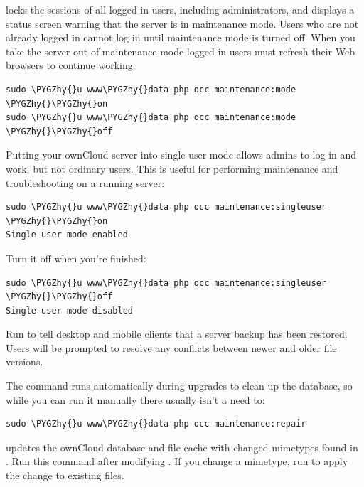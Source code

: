 \documentclass[letterpaper,10pt,english]{sphinxmanual}
\def\PYGZhy{\char`\-}
\begin{document}
 locks the sessions of all logged-in users, including
administrators, and displays a status screen warning that the server is in
maintenance mode. Users who are not already logged in cannot log in until
maintenance mode is turned off. When you take the server out of maintenance mode
logged-in users must refresh their Web browsers to continue working:

\begin{Verbatim}[commandchars=\\\{\}]
sudo \PYGZhy{}u www\PYGZhy{}data php occ maintenance:mode \PYGZhy{}\PYGZhy{}on
sudo \PYGZhy{}u www\PYGZhy{}data php occ maintenance:mode \PYGZhy{}\PYGZhy{}off
\end{Verbatim}

Putting your ownCloud server into single-user mode allows admins to log in and
work, but not ordinary users. This is useful for performing maintenance and
troubleshooting on a running server:

\begin{Verbatim}[commandchars=\\\{\}]
sudo \PYGZhy{}u www\PYGZhy{}data php occ maintenance:singleuser \PYGZhy{}\PYGZhy{}on
Single user mode enabled
\end{Verbatim}

Turn it off when you're finished:

\begin{Verbatim}[commandchars=\\\{\}]
sudo \PYGZhy{}u www\PYGZhy{}data php occ maintenance:singleuser \PYGZhy{}\PYGZhy{}off
Single user mode disabled
\end{Verbatim}

Run  to tell desktop and mobile clients that a
server backup has been restored. Users will be prompted to resolve any
conflicts between newer and older file versions.

The  command runs automatically during upgrades to clean
up the database, so while you can run it manually there usually isn't a need
to:

\begin{Verbatim}[commandchars=\\\{\}]
sudo \PYGZhy{}u www\PYGZhy{}data php occ maintenance:repair
\end{Verbatim}

 updates the ownCloud database and file cache
with changed mimetypes found in . Run this
command after modifying . If you change a
mimetype, run  to apply the
change to existing files.
\end{document}

